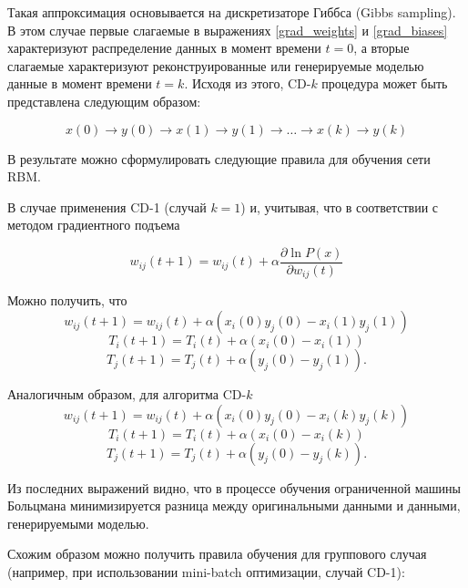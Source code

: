 Такая аппроксимация основывается на дискретизаторе Гиббса (Gibbs sampling). В этом случае первые слагаемые в выражениях \ref{grad_weights} и \ref{grad_biases} характеризуют распределение данных в момент времени $t=0$, а вторые слагаемые характеризуют реконструированные или генерируемые моделью данные в момент времени $t=k$. Исходя из этого, CD-$k$ процедура может быть представлена следующим образом:
	
\begin{equation}
	x(0) \rightarrow y(0) \rightarrow x(1) \rightarrow y(1) \rightarrow \ldots \rightarrow x(k) \rightarrow y(k)
\end{equation}
	
В результате можно сформулировать следующие правила для обучения сети RBM. 

В случае применения CD-1 (случай $k=1$) и, учитывая, что в соответствии с методом градиентного подъема
	
\begin{equation*}
	w_{ij}(t+1)=w_{ij}(t)+\alpha\frac{\partial \ln P(x)}{\partial w_{ij}(t)}
\end{equation*}	 
	
	Можно получить, что
\begin{equation*}
		w_{ij}(t+1)=w_{ij}(t)+\alpha(x_i(0)y_j(0)-x_i(1)y_j(1))
\end{equation*}
\begin{equation*}		
		T_i(t+1)=T_i(t)+\alpha(x_i(0)-x_i(1))
\end{equation*}
\begin{equation*}		
		T_j(t+1)=T_j(t)+\alpha(y_j(0)-y_j(1)).
\end{equation*}		
	
	Аналогичным образом, для алгоритма  CD-$k$
\begin{equation*}
		w_{ij}(t+1)=w_{ij}(t)+\alpha(x_i(0)y_j(0)-x_i(k)y_j(k))
\end{equation*} 
\begin{equation*}	
		T_i(t+1)=T_i(t)+\alpha(x_i(0)-x_i(k))
\end{equation*} 
\begin{equation*}		
		T_j(t+1)=T_j(t)+\alpha(y_j(0)-y_j(k)).
\end{equation*} 
	
Из последних выражений видно, что в процессе обучения ограниченной машины Больцмана минимизируется разница между оригинальными данными и данными, генерируемыми моделью.

Схожим образом можно получить правила обучения для группового случая (например, при использовании mini-batch оптимизации, случай CD-1):

